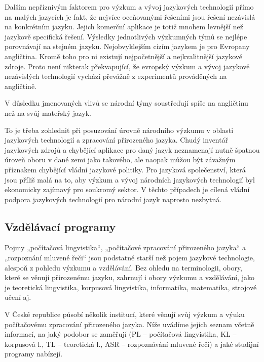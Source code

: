 \begin{multicols}{2}
Dalším nepříznivým faktorem pro výzkum a vývoj jazykových technologií přímo na malých jazycích je fakt, že nejvíce oceňovanými řešeními jsou řešení nezávislá na konkrétním jazyku. Jejich komerční aplikace je totiž mnohem levnější než jazykově specifická řešení. Výsledky jednotlivých výzkumných týmů se nejlépe porovnávají na stejném jazyku. Nejobvyklejším cizím jazykem je pro Evropany angličtina. Kromě toho pro ni existují nejpočetnější a nejkvalitnější jazykové zdroje. Proto není nikterak překvapující, že evropský výzkum a vývoj jazykově nezávislých technologií vychází převážně z experimentů prováděných na angličtině.

V důsledku jmenovaných vlivů se národní týmy soustřeďují spíše na angličtinu než na svůj mateřský jazyk. 

To je třeba zohlednit při posuzování úrovně národního výzkumu v oblasti jazykových technologií a zpracování přirozeného jazyka. Chudý inventář jazykových zdrojů a chybějící aplikace pro daný jazyk neznamenají nutně špatnou úroveň oboru v dané zemi jako takového, ale naopak můžou být závažným příznakem chybějící vládní jazykové politiky. Pro jazyková společenství, která jsou příliš malá na to, aby výzkum a vývoj národních jazykových technologií byl ekonomicky zajímavý pro soukromý sektor. V těchto případech je cílená vládní podpora jazykových technologií pro národní jazyk naprosto nezbytná.

\subsection{Vzdělávací programy}

Pojmy „počítačová lingvistika“, „počítačové zpracování přirozeného jazyka“ a „rozpoznání mluvené řeči“ jsou podstatně starší než pojem jazykové technologie, alespoň z pohledu výzkumu a vzdělávání. Bez ohledu na terminologii, obory, které se věnují přirozenému jazyku, zahrnují i obory výzkumu a vzdělávání, jako je teoretická lingvistika, korpusová lingvistika, informatika, matematika, strojové učení aj. 

V České republice působí několik institucí, které věnují svůj výzkum a výuku počítačovému zpracování přirozeného jazyka. Níže uvádíme jejich seznam včetně informací, na jaký podobor se zaměřují (PL – počítačová lingvistika, KL – korpusová l., TL – teoretická l., ASR – rozpoznávání mluvené řeči) a jaké studijní programy nabízejí.


\end{multicols}
